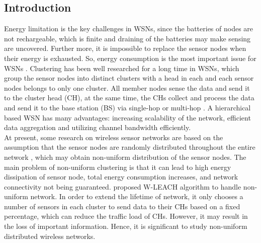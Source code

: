 \documentclass[11pt]{report}
\begin{document}
	\subsection{Introduction}
	
	Energy limitation is the key challenges in WSNs, since the batteries of nodes are not rechargeable, which is finite and draining of the batteries may make sensing are uncovered. Further more, it is impossible to replace the sensor nodes when their energy is exhausted. So, energy consumption is the most important issue for WSNs \cite{8633905,6993070}. Clustering has been well researched for a long time in WSNs, which group the sensor nodes into distinct clusters with a head in each and each sensor nodes belongs to only one cluster. All member nodes sense the data and send it to the cluster head (CH), at the same time, the CHs collect and process the data and send it to the base station (BS) via single-hop or multi-hop \cite{7855660}. A hierarchical based WSN \cite{8632891} has many advantages: increasing scalability of the network, efficient data aggregation and utilizing channel bandwidth efficiently. \\
	
	\noindent At present, some research on wireless sensor networks are based on the assumption that the sensor nodes are randomly distributed throughout the entire network \cite{7588902} \cite{8252252}, which may obtain non-uniform distribution of the sensor nodes. The main problem of non-uniform clustering is that it can lead to high energy dissipation of sensor node, total energy consumption increases, and network connectivity not being guaranteed. \cite{5693275} \cite{doi:10.1155/2013/289527} proposed W-LEACH algorithm to handle non-uniform network. In order to extend the lifetime of network, it only chooses a number of sensors in each cluster to send data to their CHs based on a fixed percentage, which can reduce the traffic load of CHs. However, it may result in the loss of important information. Hence, it is significant to study non-uniform distributed wireless networks.\\
	
\end{document}
